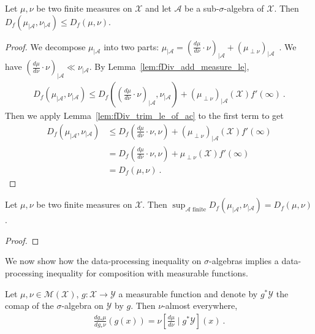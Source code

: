 \begin{theorem}
  \label{thm:fDiv_trim_le}
  \leanok
  Let $\mu, \nu$ be two finite measures on $\mathcal X$ and let $\mathcal A$ be a sub-$\sigma$-algebra of $\mathcal X$. Then
  $D_f(\mu_{| \mathcal A}, \nu_{| \mathcal A}) \le D_f(\mu, \nu)$.
\end{theorem}

\begin{proof}\leanok
{}
We decompose $\mu_{| \mathcal A}$ into two parts: $\mu_{| \mathcal A} = (\frac{d\mu}{d\nu}\cdot \nu)_{| \mathcal A} + (\mu_{\perp \nu})_{| \mathcal A}$~. 
We have $(\frac{d\mu}{d\nu}\cdot \nu)_{| \mathcal A} \ll \nu_{| \mathcal A}$.
By Lemma~\ref{lem:fDiv_add_measure_le},
\begin{align*}
D_f(\mu_{| \mathcal A}, \nu_{| \mathcal A})
\le D_f\left((\frac{d\mu}{d\nu}\cdot \nu)_{| \mathcal A}, \nu_{| \mathcal A}\right)
  + (\mu_{\perp \nu})_{| \mathcal A}(\mathcal X) f'(\infty)
\: .
\end{align*}
Then we apply Lemma~\ref{lem:fDiv_trim_le_of_ac} to the first term to get
\begin{align*}
D_f(\mu_{| \mathcal A}, \nu_{| \mathcal A})
&\le D_f\left(\frac{d\mu}{d\nu}\cdot \nu, \nu\right)
  + (\mu_{\perp \nu})_{| \mathcal A}(\mathcal X) f'(\infty)
\\
&= D_f\left(\frac{d\mu}{d\nu}\cdot \nu, \nu\right)
  + \mu_{\perp \nu}(\mathcal X) f'(\infty)
\\
&= D_f(\mu, \nu)
\: .
\end{align*}
\end{proof}


\begin{theorem}
  \label{thm:iSup_fDiv_trim}
  Let $\mu, \nu$ be two finite measures on $\mathcal X$. Then
  $\sup_{\mathcal A \text{ finite}} D_f(\mu_{| \mathcal A}, \nu_{| \mathcal A}) = D_f(\mu, \nu)$.
\end{theorem}

\begin{proof}
\end{proof}


We now show how the data-processing inequality on $\sigma$-algebras implies a data-processing inequality for composition with measurable functions.

\begin{lemma}
  \label{lem:rnDeriv_map_eq_condexp}
  \uses{}
  Let $\mu, \nu \in \mathcal M(\mathcal X)$, $g : \mathcal X \to \mathcal Y$ a measurable function and denote by $g^* \mathcal Y$ the comap of the $\sigma$-algebra on $\mathcal Y$ by $g$.
  Then $\nu$-almost everywhere,
  \begin{align*}
  \frac{d g_*\mu}{d g_*\nu}(g(x)) = \nu\left[ \frac{d \mu}{d \nu} \mid g^* \mathcal Y\right](x)
  \: .
  \end{align*}
\end{lemma}

